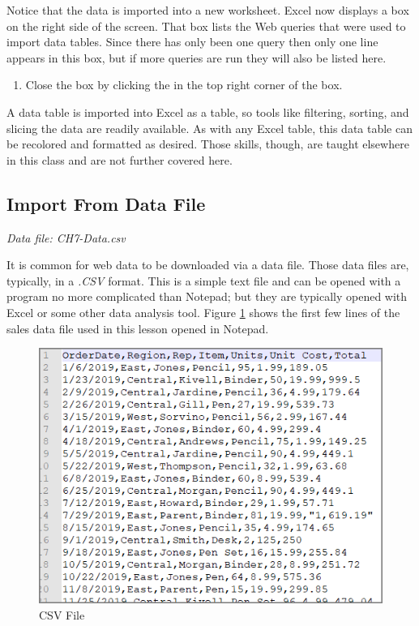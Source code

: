 Notice that the data is imported into a new worksheet. Excel now displays a  box on the right side of the screen. That box lists the Web queries that were used to import data tables. Since there has only been one query then only one line appears in this box, but if more queries are run they will also be listed here. 

\begin{enumerate}[resume]
	\item Close the  box by clicking the  in the top right corner of the box.
\end{enumerate}

A data table is imported into Excel as a table, so tools like filtering, sorting, and slicing the data are readily available. As with any Excel table, this data table can be recolored and formatted as desired. Those skills, though, are taught elsewhere in this class and are not further covered here.

\subsection{Import From Data File}

\textit{Data file: CH7-Data.csv}

It is common for web data to be downloaded via a data file. Those data files are, typically, in a \textit{.CSV} format. This is a simple text file and can be opened with a program no more complicated than Notepad; but they are typically opened with Excel or some other data analysis tool. Figure \ref{07:fig04} shows the first few lines of the sales data file used in this lesson opened in Notepad.

\begin{figure}[H]
	\centering
	\includegraphics[width=\maxwidth{.95\linewidth}]{gfx/ch07_fig04}
	\caption{CSV File}
	\label{07:fig04}
\end{figure}

